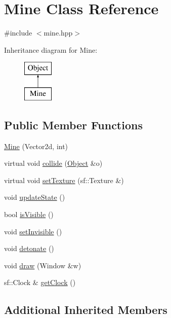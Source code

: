 \hypertarget{classMine}{}\section{Mine Class Reference}
\label{classMine}


{\ttfamily \#include $<$mine.\+hpp$>$}

Inheritance diagram for Mine\+:\begin{figure}[H]
\begin{center}
\leavevmode
\includegraphics[height=2.000000cm]{classMine}
\end{center}
\end{figure}
\subsection*{Public Member Functions}
\begin{DoxyCompactItemize}
\item 
\hyperlink{classMine_a20441a92f269fcd5f011c2dc40642838}{Mine} (Vector2d, int)
\item 
virtual void \hyperlink{classMine_a8f28428004ed7bd212913d74fc242b3f}{collide} (\hyperlink{classObject}{Object} \&o)
\item 
virtual void \hyperlink{classMine_a56c9fa642d918b17cb20a800e66423cb}{set\+Texture} (sf\+::\+Texture \&)
\item 
void \hyperlink{classMine_a2bb4b5e254618f4ba26816d6774037ed}{update\+State} ()
\item 
bool \hyperlink{classMine_a697a4d8d3872b2155f85ea85347dadda}{is\+Visible} ()
\item 
void \hyperlink{classMine_a8f5acea497c11f9882c74c6e3f3a1554}{set\+Invisible} ()
\item 
void \hyperlink{classMine_a03dc6fa52215e83fe6a1aadc18c9b163}{detonate} ()
\item 
void \hyperlink{classMine_a6305c033929abf20ce4b1c212177d5ec}{draw} (Window \&w)
\item 
sf\+::\+Clock \& \hyperlink{classMine_a21cdef836d82c5fa0bed3125b338181b}{get\+Clock} ()
\end{DoxyCompactItemize}
\subsection*{Additional Inherited Members}



